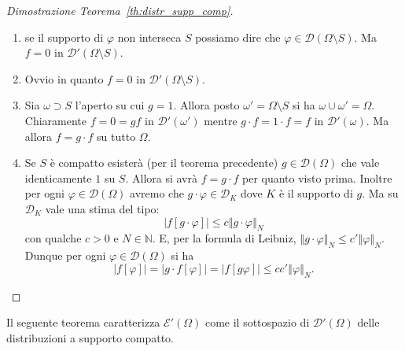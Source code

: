 \documentclass[italian,a4paper,oneside,headinclude]{scrbook}
\renewcommand{\phi}{\varphi}
\newcommand{\D}{\mathcal D}
\newcommand{\E}{\mathcal E}
\newcommand{\NN}{\mathbb N}
\newcommand{\abs}[1]{{\left|#1\right|}}
\newcommand{\Abs}[1]{{\left\Vert #1\right\Vert}}
\begin{document}
\begin{proof}[Dimostrazione Teorema~\ref{th:distr_supp_comp}]
  \begin{enumerate}
  \item se il supporto di $\phi$ non interseca $S$ possiamo dire che
    $\phi\in \D(\Omega\setminus S)$. Ma $f=0$ in $\D'(\Omega\setminus
    S)$.
  \item Ovvio in quanto $f=0$ in $\D'(\Omega\setminus S)$.
  \item Sia $\omega\supset S$ l'aperto su cui $g=1$.
    Allora posto $\omega' = \Omega\setminus S$ si ha $\omega \cup
    \omega' = \Omega$.
    Chiaramente $f=0=gf$ in $\D'(\omega')$ mentre $g\cdot f=1\cdot f=f$ in
    $\D'(\omega)$. Ma allora $f=g\cdot f$ su tutto $\Omega$.

  \item Se $S$ è compatto esisterà (per il teorema precedente)
    $g\in \D(\Omega)$ che vale
    identicamente $1$ su $S$. Allora si avrà $f=g\cdot f$ per quanto visto
    prima. Inoltre per ogni $\phi\in \D(\Omega)$ avremo che
    $g\cdot \phi\in \D_K$ dove $K$ è il supporto di $g$.
    Ma su $\D_K$ vale una stima del tipo:
    \[
    \abs{f[g\cdot \phi]} \le c \Abs{g\cdot \phi}_N
    \]
    con qualche $c>0$ e $N\in \NN$.
    E, per la formula di Leibniz,
    $\Abs{g\cdot \phi}_N \le c'\Abs{\phi}_N$.
    Dunque per ogni $\phi\in\D(\Omega)$ si ha
    \[
    \abs{f[\phi]} = \abs{g\cdot f[\phi]} = \abs{f[g\phi]}
    \le cc'\Abs{\phi}_N.
    \]
  \end{enumerate}
\end{proof}

Il seguente
\marginpar{$\E'(\Omega)$}
teorema caratterizza $\E'(\Omega)$ come
il sottospazio di $\D'(\Omega)$ delle distribuzioni a supporto
compatto.
\end{document}
